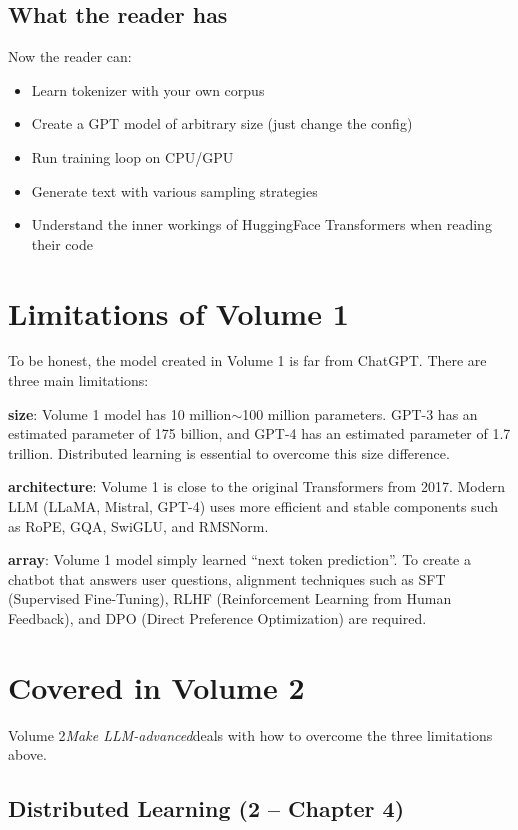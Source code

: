 \subsection{What the reader has}

Now the reader can:
\begin{itemize}
\item Learn tokenizer with your own corpus
\item Create a GPT model of arbitrary size (just change the config)
\item Run training loop on CPU/GPU
\item Generate text with various sampling strategies
\item Understand the inner workings of HuggingFace Transformers when reading their code
\end{itemize}

\section{Limitations of Volume 1}

To be honest, the model created in Volume 1 is far from ChatGPT. There are three main limitations:

\textbf{size}: Volume 1 model has 10 million$\sim$100 million parameters. GPT-3 has an estimated parameter of 175 billion, and GPT-4 has an estimated parameter of 1.7 trillion. Distributed learning is essential to overcome this size difference.

\textbf{architecture}: Volume 1 is close to the original Transformers from 2017. Modern LLM (LLaMA, Mistral, GPT-4) uses more efficient and stable components such as RoPE, GQA, SwiGLU, and RMSNorm.

\textbf{array}: Volume 1 model simply learned ``next token prediction''. To create a chatbot that answers user questions, alignment techniques such as SFT (Supervised Fine-Tuning), RLHF (Reinforcement Learning from Human Feedback), and DPO (Direct Preference Optimization) are required.

\section{Covered in Volume 2}

Volume 2\textit{Make LLM-advanced}deals with how to overcome the three limitations above.

\subsection{Distributed Learning (2  --  Chapter 4)}

